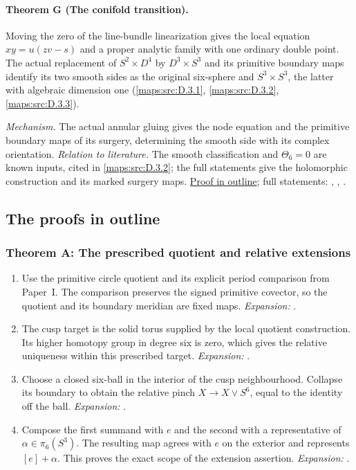 \hypertarget{main-III-G}{}
\paragraph{Theorem G (The conifold transition).}
\label{series:III:G}
Moving the zero of the line-bundle linearization gives the local
equation $xy=u(zv-s)$ and a proper analytic family with one ordinary
double point. The actual replacement of $S^2\times D^4$ by
$D^3\times S^3$ and its primitive boundary maps identify its two
smooth sides as the original six-sphere and $S^3\times S^3$,
the latter with algebraic dimension one
(\cref{maps:src:D.3.1}, \cref{maps:src:D.3.2}, \cref{maps:src:D.3.3}).

\textit{Mechanism.} The actual annular gluing gives the node equation and the primitive boundary maps of its surgery, determining the smooth side with its complex orientation.
\textit{Relation to literature.} The smooth classification and $\Theta_6=0$ are known inputs, cited in \cref{maps:src:D.3.2}; the full statements give the holomorphic construction and its marked surgery maps.
\hyperlink{outline-III-G}{Proof in outline}; full statements: , , .

\subsection{The proofs in outline}
\hypertarget{outline-III-A}{}
\subsubsection*{Theorem A: The prescribed quotient and relative extensions}
\begin{enumerate}[label=\arabic*.,leftmargin=*]
\item\hypertarget{step-III-A-1}{} Use the primitive circle quotient and its explicit period
comparison from Paper~I.  The comparison preserves the signed primitive
covector, so the quotient and its boundary meridian are fixed maps.
\textit{Expansion:} .
\item\hypertarget{step-III-A-2}{} The cusp target is the solid torus supplied by the local quotient
construction.  Its higher homotopy group in degree six is zero, which
gives the relative uniqueness within this prescribed target.
\textit{Expansion:} .
\item\hypertarget{step-III-A-3}{} Choose a closed six-ball in the interior of the cusp
neighbourhood.  Collapse its boundary to obtain the relative pinch
$X\to X\vee S^6$, equal to the identity off the ball.
\textit{Expansion:} .
\item\hypertarget{step-III-A-4}{} Compose the first summand with $e$ and the second with a
representative of $\alpha\in\pi_6(S^3)$.  The resulting map agrees
with $e$ on the exterior and represents $[e]+\alpha$.
This proves the exact scope of the extension assertion.
\textit{Expansion:} .
\end{enumerate}

